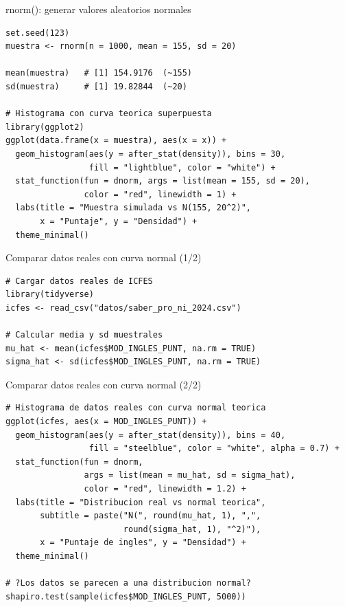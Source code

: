 \documentclass[aspectratio=169, 11pt]{beamer}
\begin{document}
\begin{frame}[fragile]{rnorm(): generar valores aleatorios normales}
\begin{lstlisting}
set.seed(123)
muestra <- rnorm(n = 1000, mean = 155, sd = 20)

mean(muestra)   # [1] 154.9176  (~155)
sd(muestra)     # [1] 19.82844  (~20)

# Histograma con curva teorica superpuesta
library(ggplot2)
ggplot(data.frame(x = muestra), aes(x = x)) +
  geom_histogram(aes(y = after_stat(density)), bins = 30,
                 fill = "lightblue", color = "white") +
  stat_function(fun = dnorm, args = list(mean = 155, sd = 20),
                color = "red", linewidth = 1) +
  labs(title = "Muestra simulada vs N(155, 20^2)",
       x = "Puntaje", y = "Densidad") +
  theme_minimal()
\end{lstlisting}
\end{frame}

\begin{frame}[fragile]{Comparar datos reales con curva normal (1/2)}
\begin{lstlisting}
# Cargar datos reales de ICFES
library(tidyverse)
icfes <- read_csv("datos/saber_pro_ni_2024.csv")

# Calcular media y sd muestrales
mu_hat <- mean(icfes$MOD_INGLES_PUNT, na.rm = TRUE)
sigma_hat <- sd(icfes$MOD_INGLES_PUNT, na.rm = TRUE)
\end{lstlisting}
\end{frame}

\begin{frame}[fragile]{Comparar datos reales con curva normal (2/2)}
\begin{lstlisting}
# Histograma de datos reales con curva normal teorica
ggplot(icfes, aes(x = MOD_INGLES_PUNT)) +
  geom_histogram(aes(y = after_stat(density)), bins = 40,
                 fill = "steelblue", color = "white", alpha = 0.7) +
  stat_function(fun = dnorm,
                args = list(mean = mu_hat, sd = sigma_hat),
                color = "red", linewidth = 1.2) +
  labs(title = "Distribucion real vs normal teorica",
       subtitle = paste("N(", round(mu_hat, 1), ",",
                        round(sigma_hat, 1), "^2)"),
       x = "Puntaje de ingles", y = "Densidad") +
  theme_minimal()

# ?Los datos se parecen a una distribucion normal?
shapiro.test(sample(icfes$MOD_INGLES_PUNT, 5000))
\end{lstlisting}
\end{frame}
\end{document}
